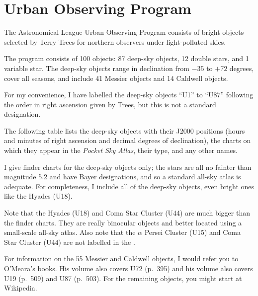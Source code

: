
\chapter{Urban Observing Program}

The Astronomical League Urban Observing Program consists of bright objects selected by Terry Trees for northern observers under light-polluted skies. 

The program consists of 100 objects: 87 deep-sky objects, 12 double stars, and 1 variable star. The deep-sky objects range in declination from $-35$ to $+72$ degrees, cover all seasons, and include 41 Messier objects and 14 Caldwell objects.  

For my convenience, I have labelled the deep-sky objects “U1” to “U87” following the order in right ascension given by Trees, but this is not a standard designation. 

The following table lists the deep-sky objects with their J2000 positions (hours and minutes of right ascension and decimal degrees of declination), the charts on which they appear in the \emph{Pocket Sky Atlas}, their type, and any other names. 

I give finder charts for the deep-sky objects only; the stars are all no fainter than magnitude 5.2 and have Bayer designations, and so a standard all-sky atlas is adequate. For completeness, I include all of the deep-sky objects, even bright ones like the Hyades (U18).

Note that the Hyades (U18) and Coma Star Cluster (U44) are much bigger than the finder charts. They are really binocular objects and better located using a small-scale all-sky atlas. Also note that the $\alpha$ Persei Cluster (U15) and Coma Star Cluster (U44) are not labelled in the {\PSA}. 

For information on the 55 Messier and Caldwell objects, I would refer you to O’Meara’s  books. His  volume also covers U72 (p.\ 395) and his  volume also covers U19 (p.\ 509) and U87 (p.~503). For the remaining objects, you might start at Wikipedia.

\clearpage

